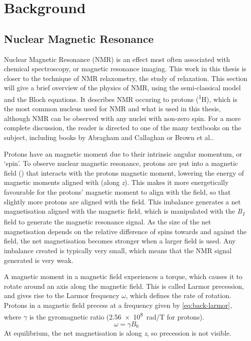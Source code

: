 \chapter{Background}\label{ch:background}

\section{Nuclear Magnetic Resonance}

Nuclear Magnetic Resonance (NMR) is an effect most often associated with chemical spectroscopy, or magnetic resonance imaging.
This work in this thesis is closer to the technique of NMR relaxometry, the study of relaxation.
This section will give a brief overview of the physics of NMR, using the semi-classical model and the Bloch equations.
It describes NMR occuring to protons (\textsuperscript{1}H), which is the most common nucleus used for NMR and what is used in this thesis, although NMR can be observed with any nuclei with non-zero spin.
For a more complete discussion, the reader is directed to one of the many textbooks on the subject, including books by Abragham\cite{AbragamPrinciplesNuclearMagnetism1961} and Callaghan\cite{CallaghanPrinciplesNuclearMagnetic1994} or Brown et al.\cite{BrownMagneticResonanceImaging2014a}.

Protons have an magnetic moment due to their intrinsic angular momentum, or `spin'.
To observe nuclear magnetic resonance, protons are put into a magnetic field (\Bzero) that interacts with the protons magnetic moment, lowering the energy of magnetic moments aligned with \Bzero (along \textit{z}).
This makes it more energetically favourable for the protons' magnetic moment to align with the field, so that slightly more protons are aligned with the field.
This imbalance generates a net magnetisation aligned with the magnetic field, which is manipulated with the \textit{B\textsubscript{1}} field to generate the magnetic resonance signal.
As the size of the net magnetisation depends on the relative difference of spins towards and against the field, the net magnetisation becomes stronger when a larger \Bzero field is used.
Any imbalance created is typically very small, which means that the NMR signal generated is very weak.


A magnetic moment in a magnetic field experiences a torque, which causes it to rotate around an axis along the magnetic field.
This is called Larmor precession, and gives rise to the Larmor frequency $\omega$, which defines the rate of rotation.
Protons in a magnetic field precess at a frequency given by \autoref{eq:back-larmor}, where $\gamma$ is the gyromagnetic ratio (\SI{2.56e8}{rad/T} for protons).
\begin{equation}
\omega = \gamma B_0
\label{eq:back-larmor}
\end{equation}
At equilibrium, the net magnetisation is along \textit{z}, so precession is not visible.

